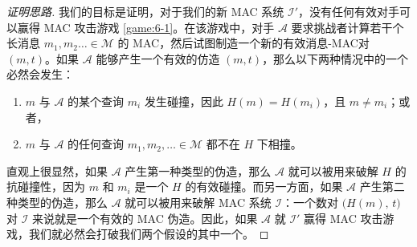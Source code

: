 \begin{proof}[证明思路]
我们的目标是证明，对于我们的新 MAC 系统 $\mathcal{I}'$，没有任何有效对手可以赢得 MAC 攻击游戏 \ref{game:6-1}。在该游戏中，对手 $\mathcal{A}$ 要求挑战者计算若干个长消息 $m_1,m_2\dots\in\mathcal{M}$ 的 MAC，然后试图制造一个新的有效消息-MAC对 $(m,t)$。如果 $\mathcal{A}$ 能够产生一个有效的仿造 $(m,t)$，那么以下两种情况中的一个必然会发生：
\begin{enumerate}
	\item $m$ 与 $\mathcal{A}$ 的某个查询 $m_i$ 发生碰撞，因此 $H(m)=H(m_i)$，且 $m\neq m_i$；或者，
	\item $m$ 与 $\mathcal{A}$ 的任何查询 $m_1,m_2,\dots\in\mathcal{M}$ 都不在 $H$ 下相撞。
\end{enumerate}
直观上很显然，如果 $\mathcal{A}$ 产生第一种类型的伪造，那么 $\mathcal{A}$ 就可以被用来破解 $H$ 的抗碰撞性，因为 $m$ 和 $m_i$ 是一个 $H$ 的有效碰撞。而另一方面，如果 $\mathcal{A}$ 产生第二种类型的伪造，那么 $\mathcal{A}$ 就可以被用来破解 MAC 系统 $\mathcal{I}$：一个数对 $\big(H(m),\,t\big)$ 对 $\mathcal{I}$ 来说就是一个有效的 MAC 伪造。因此，如果 $\mathcal{A}$ 就 $\mathcal{I}'$ 赢得 MAC 攻击游戏，我们就必然会打破我们两个假设的其中一个。
\end{proof}

